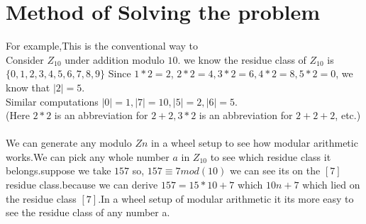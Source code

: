 \documentclass{article}
\begin{document}
\section{Method of Solving the problem}
For example,This is the conventional way to  \\
Consider $Z_{10}$ under addition modulo $10$. 
we know the residue class of $Z_{10}$ is $\{0,1,2,3,4,5,6,7,8,9\}$
Since $1 * 2 = 2$,
$2 * 2 = 4, 3 * 2 = 6, 4 * 2 = 8, 5 * 2 = 0$, we know that $|2| = 5$. \\
Similar computations  $|0| = 1, |7| = 10, |5| = 2, |6| = 5$.\\ (Here $2 * 2$ is an
abbreviation for $2 + 2, 3 * 2 $ is an abbreviation for $2 + 2 + 2$, etc.)\cite{gallian2021contemporary}\\\\
We can generate any modulo $Z n$ in a wheel setup to see how modular arithmetic works.We can pick any whole number $a$ in $Z_{10}$ to see which residue class it belongs.suppose we take $157$ so, $157 \equiv 7 mod (10)$ we can see its on the $[7] $ residue class.because we can derive $157 = 15*10 + 7$ which $10n+7$ which lied on the residue class $[7]$.In a wheel setup of modular arithmetic it its more easy to see the residue class of any number a. \\\\
\end{document}
